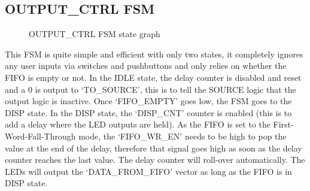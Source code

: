 \documentclass[11pt]{report}
\begin{document}
\subsection*{OUTPUT\_CTRL FSM}

\begin{figure}[h]
    \centering
    \caption{OUTPUT\_CTRL FSM state graph}
\end{figure}

This FSM is quite simple and efficient with only two states, it completely ignores any user inputs via
switches and pushbuttons and only relies on whether the FIFO is empty or not. In the IDLE state, the delay
counter is disabled and reset and a 0 is output to `TO\_SOURCE', this is to tell the SOURCE logic that the
output logic is inactive. Once `FIFO\_EMPTY' goes low, the FSM goes to the DISP state. In the DISP state,
the `DISP\_CNT' counter is enabled (this is to add a delay where the LED outputs are held). As the FIFO is
set to the First-Word-Fall-Through mode, the `FIFO\_WR\_EN' needs to be high to pop the value at the end of
the delay, therefore that signal goes high as soon as the delay counter reaches the last value. The delay
counter will roll-over automatically. The LEDs will output the `DATA\_FROM\_FIFO' vector as long as the FIFO
is in DISP state.

\begin{landscape}
    \begin{table}
    \centering
    \caption{OUTPUT\_CTRL FSM table of outputs}
    \end{table}
\end{landscape}
\end{document}
